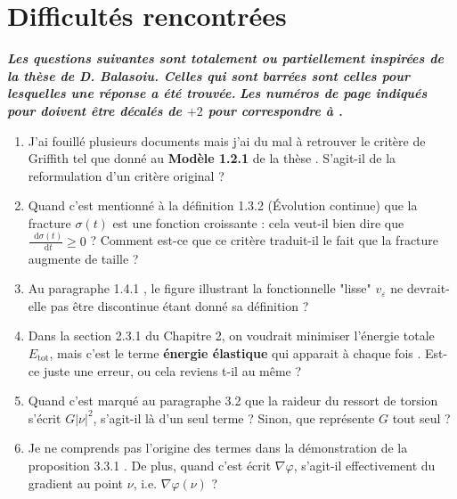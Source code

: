 \documentclass[
  french,
	11pt, %
]{fphw}
\newcommand*\diff{\mathop{}\!\mathrm{d}}
\begin{document}

\section{Difficultés rencontrées}

\textbf{\textit{Les questions suivantes sont totalement ou partiellement inspirées de la thèse de D. Balasoiu. Celles qui sont barrées sont celles pour lesquelles une réponse a été trouvée.}}
\textbf{\textit{Les numéros de page indiqués pour \parencite{balasoiu2020thesis} doivent être décalés de $+2$ pour correspondre à \parencite{balasoiu2020halthesis}.}}

\begin{enumerate}
  \item J'ai fouillé plusieurs documents mais j'ai du mal à retrouver le critère de Griffith tel que donné au \textbf{Modèle 1.2.1} de la thèse \parencite[p.32]{balasoiu2020thesis}. S'agit-il de la reformulation d'un critère original ?
  \item Quand c'est mentionné à la définition 1.3.2 (Évolution continue) \parencite[p.37]{balasoiu2020thesis} que la fracture $\sigma(t)$ est une fonction croissante : cela veut-il bien dire que $\frac{\diff{\sigma (t)}}{\diff{t}} \geq 0$ ? Comment est-ce que ce critère traduit-il le fait que la fracture augmente de taille ?
  \item Au paragraphe 1.4.1 \parencite[p.37]{balasoiu2020thesis}, le figure illustrant la fonctionnelle "lisse" $v_{\varepsilon}$ ne devrait-elle pas être discontinue étant donné sa définition ?
  \item Dans la section 2.3.1 du Chapitre 2, on voudrait minimiser l'énergie totale $E_{\text{tot}}$, mais c'est le terme \textbf{énergie élastique} qui apparait à chaque fois \parencite[p.49]{balasoiu2020thesis}. Est-ce juste une erreur, ou cela reviens t-il au même ?
  \item Quand c'est marqué au paragraphe 3.2 \parencite[p.92]{balasoiu2020halthesis} que la raideur du ressort de torsion s'écrit $G\vert \nu \vert^2$, s'agit-il là d'un seul terme ? Sinon, que représente $G$ tout seul ?
  \item Je ne comprends pas l'origine des termes dans la démonstration de la proposition 3.3.1 \parencite[p.93]{balasoiu2020halthesis}. De plus, quand c'est écrit $\nabla \varphi$, s'agit-il effectivement du gradient au point $\nu$, i.e. $\nabla \varphi (\nu)$ ?
\end{enumerate}
\end{document}
